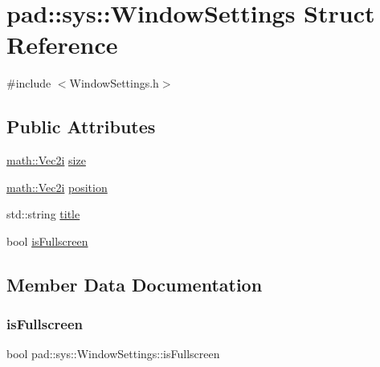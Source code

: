 \hypertarget{structpad_1_1sys_1_1_window_settings}{}\section{pad\+:\+:sys\+:\+:Window\+Settings Struct Reference}
\label{structpad_1_1sys_1_1_window_settings}


{\ttfamily \#include $<$Window\+Settings.\+h$>$}

\subsection*{Public Attributes}
\begin{DoxyCompactItemize}
\item 
\mbox{\hyperlink{namespacepad_1_1math_a808a631a6bccd994f9589d7fb86bad41}{math\+::\+Vec2i}} \mbox{\hyperlink{structpad_1_1sys_1_1_window_settings_ae17577bc348bec80b1084829ac85165e}{size}}
\item 
\mbox{\hyperlink{namespacepad_1_1math_a808a631a6bccd994f9589d7fb86bad41}{math\+::\+Vec2i}} \mbox{\hyperlink{structpad_1_1sys_1_1_window_settings_ab0939a5319fe921d3d4a0ed66e6a1784}{position}}
\item 
std\+::string \mbox{\hyperlink{structpad_1_1sys_1_1_window_settings_ab4d283bf8a194b7dc8c6f44187cf3ae5}{title}}
\item 
bool \mbox{\hyperlink{structpad_1_1sys_1_1_window_settings_a03521cc9e9cf3eb02f5b36eecd6ce473}{is\+Fullscreen}}
\end{DoxyCompactItemize}


\subsection{Member Data Documentation}
\mbox{\label{structpad_1_1sys_1_1_window_settings_a03521cc9e9cf3eb02f5b36eecd6ce473}} 
\subsubsection{\texorpdfstring{is\+Fullscreen}{isFullscreen}}
{\footnotesize\ttfamily bool pad\+::sys\+::\+Window\+Settings\+::is\+Fullscreen}

